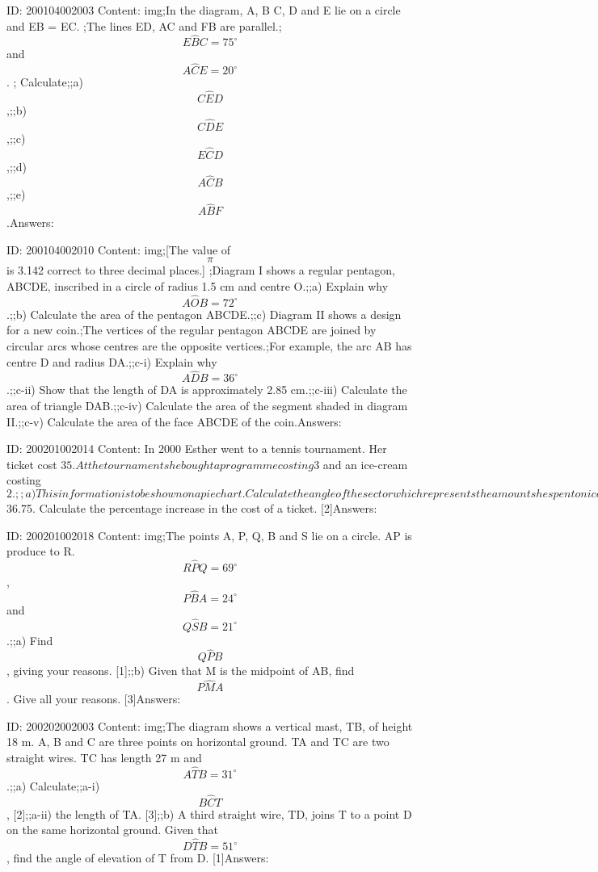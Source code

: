 \documentclass{article}
\begin{document}
ID: 200104002003
Content:
img;In the diagram, A, B C, D and E lie on a circle and EB = EC. ;The lines ED, AC and FB are parallel.;$$E \hat BC = 75^{\circ}$$ and $$A \hat CE = 20^{\circ}$$. ; Calculate;;a) $$C \hat ED$$,;;b) $$C \hat DE$$,;;c) $$E \hat CD$$,;;d) $$A \hat CB$$,;;e) $$A \hat BF$$.Answers:

ID: 200104002010
Content:
img;[The value of $$\pi$$ is 3.142 correct to three decimal places.] ;Diagram I shows a regular pentagon, ABCDE, inscribed in a circle of radius 1.5 cm and centre O.;;a) Explain why $$A \hat OB = 72^{\circ}$$.;;b) Calculate the area of the pentagon ABCDE.;;c) Diagram II shows a design for a new coin.;The vertices of the regular pentagon ABCDE are joined by circular arcs whose centres are the opposite vertices.;For example, the arc AB has centre D and radius DA.;;c-i) Explain why $$A \hat DB = 36^{\circ}$$.;;c-ii) Show that the length of DA is approximately 2.85 cm.;;c-iii) Calculate the area of triangle DAB.;;c-iv) Calculate the area of the segment shaded in diagram II.;;c-v) Calculate the area of the face ABCDE of the coin.Answers:

ID: 200201002014
Content:
In 2000 Esther went to a tennis tournament. Her ticket cost $35. At the tournament she bought a programme costing $3 and an ice-cream costing $2.;;a) This information is to be shown on a pie chart. Calculate the angle of the sector which represents the amount she spent on ice-cream. [2];;b) In 2001 the cost of a ticket was $36.75. Calculate the percentage increase in the cost of a ticket. [2]Answers:

ID: 200201002018
Content:
img;The points A, P, Q, B and S lie on a circle. AP is produce to R. $$R \hat PQ=69^{\circ}$$, $$P \hat BA=24^{\circ}$$ and $$Q \hat SB=21^{\circ}$$.;;a) Find $$Q \hat PB$$, giving your reasons. [1];;b) Given that M is the midpoint of AB, find $$P \hat MA$$. Give all your reasons. [3]Answers:

ID: 200202002003
Content:
img;The diagram shows a vertical mast, TB, of height 18 m. A, B and C are three points on horizontal ground. TA and TC are two straight wires. TC has length 27 m and $$A \hat TB=31^{\circ}$$.;;a) Calculate;;a-i) $$B \hat CT$$, [2];;a-ii) the length of TA. [3];;b) A third straight wire, TD, joins T to a point D on the same horizontal ground. Given that $$D \hat TB=51^{\circ}$$, find the angle of elevation of T from D. [1]Answers:
\end{document}
